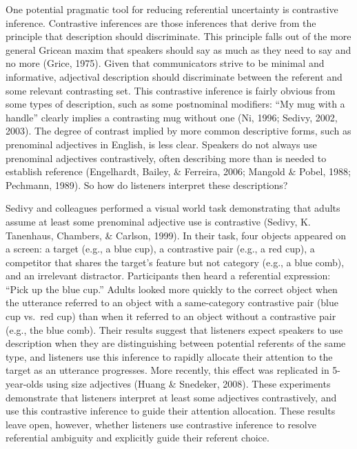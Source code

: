 \documentclass[10pt, letterpaper]{article}
\begin{document}
One potential pragmatic tool for reducing referential uncertainty is
contrastive inference. Contrastive inferences are those inferences that
derive from the principle that description should discriminate. This
principle falls out of the more general Gricean maxim that speakers
should say as much as they need to say and no more (Grice, 1975). Given
that communicators strive to be minimal and informative, adjectival
description should discriminate between the referent and some relevant
contrasting set. This contrastive inference is fairly obvious from some
types of description, such as some postnominal modifiers: ``My mug with
a handle'' clearly implies a contrasting mug without one (Ni, 1996;
Sedivy, 2002, 2003). The degree of contrast implied by more common
descriptive forms, such as prenominal adjectives in English, is less
clear. Speakers do not always use prenominal adjectives contrastively,
often describing more than is needed to establish reference (Engelhardt,
Bailey, \& Ferreira, 2006; Mangold \& Pobel, 1988; Pechmann, 1989). So
how do listeners interpret these descriptions?

Sedivy and colleagues performed a visual world task demonstrating that
adults assume at least some prenominal adjective use is contrastive
(Sedivy, K. Tanenhaus, Chambers, \& Carlson, 1999). In their task, four
objects appeared on a screen: a target (e.g., a blue cup), a contrastive
pair (e.g., a red cup), a competitor that shares the target's feature
but not category (e.g., a blue comb), and an irrelevant distractor.
Participants then heard a referential expression: ``Pick up the blue
cup.'' Adults looked more quickly to the correct object when the
utterance referred to an object with a same-category contrastive pair
(blue cup vs.~red cup) than when it referred to an object without a
contrastive pair (e.g., the blue comb). Their results suggest that
listeners expect speakers to use description when they are
distinguishing between potential referents of the same type, and
listeners use this inference to rapidly allocate their attention to the
target as an utterance progresses. More recently, this effect was
replicated in 5-year-olds using size adjectives (Huang \& Snedeker,
2008). These experiments demonstrate that listeners interpret at least
some adjectives contrastively, and use this contrastive inference to
guide their attention allocation. These results leave open, however,
whether listeners use contrastive inference to resolve referential
ambiguity and explicitly guide their referent choice.
\end{document}
